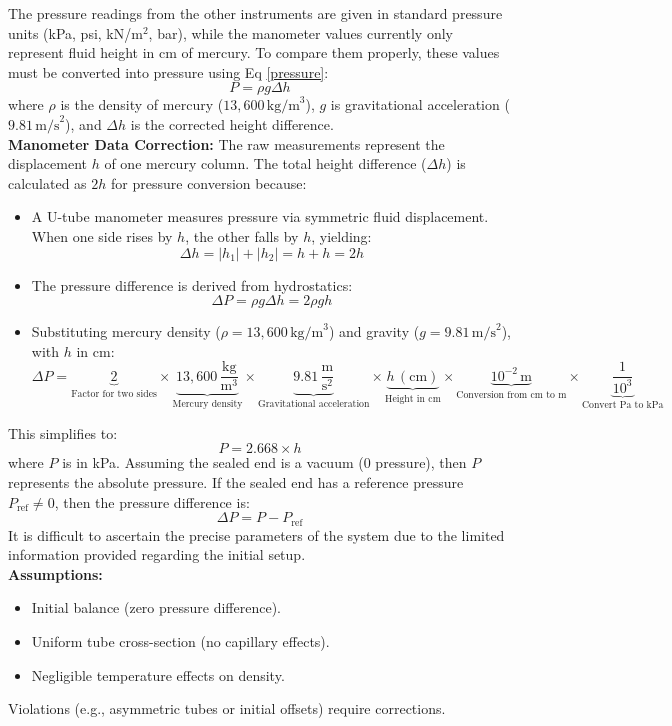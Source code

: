 \documentclass{article}
\begin{document}
\noindent
The pressure readings from the other instruments are given in standard pressure units (kPa, psi, kN/m\(^2\), bar), while the manometer values currently only represent fluid height in cm of mercury. To compare them properly, these values must be converted into pressure using Eq \ref{pressure}:
\[P = \rho g \Delta h\]
where \( \rho \) is the density of mercury (\(13,600 \, \text{kg/m}^3\)), \( g \) is gravitational acceleration (\(9.81 \, \text{m/s}^2\)), and $\Delta h$ is the corrected height difference.\\[1em]
\textbf{Manometer Data Correction:} The raw measurements represent the displacement \( h \) of one mercury column. The total height difference (\(\Delta h\)) is calculated as \( 2h \) for pressure conversion because:
	\begin{itemize}
		\item A U-tube manometer measures pressure via symmetric fluid displacement. When one side rises by \( h \), the other falls by \( h \), yielding:
		\[\Delta h = |h_1| + |h_2| = h + h = 2h\]
		\item The pressure difference is derived from hydrostatics:
		\[\Delta P = \rho g \Delta h = 2 \rho g h\]
		\item Substituting mercury density (\(\rho = 13,\!600\,\text{kg/m}^3\)) and gravity (\(g = 9.81\,\text{m/s}^2\)), with \( h \) in cm:
			\[
			\Delta P = \underbrace{2}_{\text{Factor for two sides}} \times \underbrace{13,600 \, \frac{\text{kg}}{\text{m}^3}}_{\text{Mercury density}} \times \underbrace{9.81 \, \frac{\text{m}}{\text{s}^2}}_{\text{Gravitational acceleration}} \times \underbrace{h \, (\text{cm})}_{\text{Height in cm}} \times \underbrace{10^{-2} \, \text{m}}_{\text{Conversion from cm to m}} \times \underbrace{\frac{1}{10^3}}_{\text{Convert Pa to kPa}}
			\]
	\end{itemize}
\newpage{}
\begin{minipage}{0.55\textwidth}
This simplifies to:
\[P = 2.668 \times h\]
where \( P \) is in kPa. Assuming the sealed end is a vacuum (0 pressure), then \( P \) represents the absolute pressure. If the sealed end has a reference pressure \( P_{\text{ref}} \neq 0 \), then the pressure difference is:
\[\Delta P = P - P_{\text{ref}}\]
It is difficult to ascertain the precise parameters of the system due to the limited information provided regarding the initial setup. \\[4pt]
\textbf{Assumptions:} 
\begin{itemize}
	\item Initial balance (zero pressure difference).
	\item Uniform tube cross-section (no capillary effects).
	\item Negligible temperature effects on density.
\end{itemize}\vspace{0.2em}
Violations (e.g., asymmetric tubes or initial offsets) require corrections. 
\end{minipage}\hspace{1em}
\end{document}
